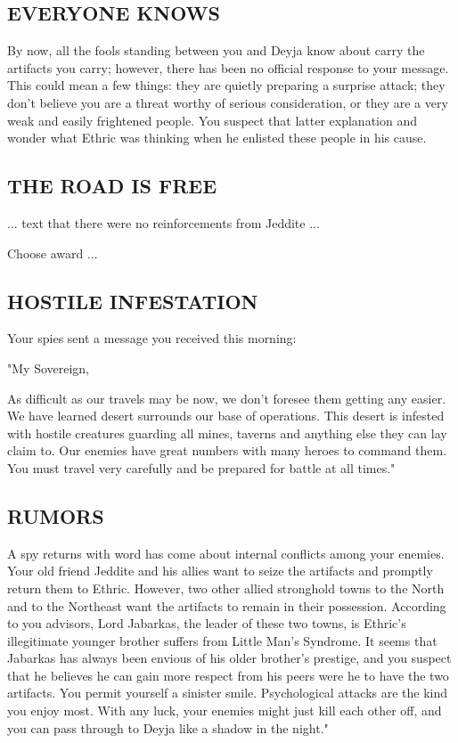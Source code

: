 \begin{multicols*}{2}
\subsection*{\MakeUppercase{Everyone knows}}

By now, all the fools standing between you and Deyja know about carry the artifacts you carry; however, there has been no official response to your message. This could mean a few things: they are quietly preparing a surprise attack; they don't believe you are a threat worthy of serious consideration, or they are a very weak and easily frightened people. You suspect that latter explanation and wonder what Ethric was thinking when he enlisted these people in his cause.


\subsection*{\MakeUppercase{The road is free}}

... text that there were no reinforcements from Jeddite ...

\textcolor{darkcandyapplered}{Choose award ...}


\subsection*{\MakeUppercase{Hostile infestation}}

Your spies sent a message you received this morning:

\begin{itshape}
"My Sovereign,

As difficult as our travels may be now, we don't foresee them getting any easier. We have learned desert surrounds our base of operations. This desert is infested with hostile creatures guarding all mines, taverns and anything else they can lay claim to. Our enemies have great numbers with many heroes to command them. You must travel very carefully and be prepared for battle at all times."
\end{itshape}

\textcolor{darkcandyapplered}{}

\subsection*{\MakeUppercase{Rumors}}

A spy returns with word has come about internal conflicts among your enemies. Your old friend Jeddite and his allies want to seize the artifacts and promptly return them to Ethric. However, two other allied stronghold towns to the North and to the Northeast want the artifacts to remain in their possession. According to you advisors, Lord Jabarkas, the leader of these two towns, is Ethric's illegitimate younger brother suffers from Little Man's Syndrome. It seems that Jabarkas has always been envious of his older brother's prestige, and you suspect that he believes he can gain more respect from his peers were he to have the two artifacts.
You permit yourself a sinister smile. Psychological attacks are the kind you enjoy most. With any luck, your enemies might just kill each other off, and you can pass through to Deyja like a shadow in the night."



\end{multicols*}
